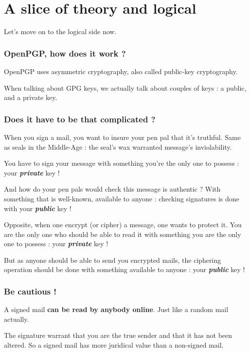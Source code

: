 \chapter{A slice of theory and logical}

Let's move on to the logical side now.

\subsection{OpenPGP, how does it work ?}\label{openpgp-how-does-it-work}

OpenPGP uses asymmetric cryptography, also called public-key
cryptography.

When talking about GPG keys, we actually talk about couples of keys : a
public, and a private key.

\subsection{Does it have to be that complicated ?}\label{does-it-have-to-be-that-complicated}

When you sign a mail, you want to insure your pen pal that it's
truthful. Same as seals in the Middle-Age : the seal's wax warranted
message's inviolability.

You have to sign your message with something you're the only one to
possess : your \textbf{\emph{private}} key !

And how do your pen pals would check this message is authentic ? With
something that is well-known, available to anyone : checking signatures
is done with your \textbf{\emph{public}} key !

Opposite, when one encrypt (or cipher) a message, one wants to protect
it. You are the only one who should be able to read it with something
you are the only one to possess : your \textbf{\emph{private}} key !

But as anyone should be able to send you encrypted mails, the ciphering
operation should be done with something available to anyone : your
\textbf{\emph{public}} key !

\subsection{Be cautious !}\label{be-cautious}

A signed mail \textbf{can be read by anybody online}. Just like a random
mail actually.

The signature warrant that you are the true sender and that it has not
been altered. So a signed mail has more juridical value than a
non-signed mail.

